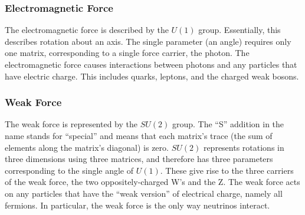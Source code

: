 \subsubsection{Electromagnetic Force}
The electromagnetic force is described by the $U(1)$ group.  
Essentially, this describes rotation about an axis.  %
The single parameter (an angle) requires only one matrix, 
corresponding to a single %
force carrier, the photon.  
The electromagnetic force causes interactions between 
photons and any particles that have electric charge.  
This includes quarks, leptons, and the charged weak bosons.  

\subsubsection{Weak Force}
The weak force is represented by the $SU(2)$ group.  
The ``S'' addition in the name stands for ``special'' 
and means that each matrix's trace 
(the sum of elements along the matrix's diagonal) is zero.  
$SU(2)$ represents rotations in three dimensions 
using three matrices, 
and therefore has three parameters corresponding 
to the single angle of $U(1)$.  
These give rise to the three carriers of the weak force, 
the two oppositely-charged W's and the Z.  %
The weak force acts on any particles that have the ``weak 
version'' of electrical charge, %
namely all fermions.  
In particular, the weak force is the only way 
neutrinos interact.  

